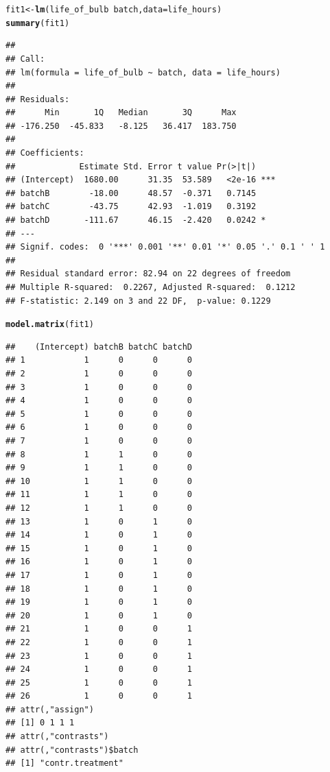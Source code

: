 \documentclass[11pt, a4paper]{article}\usepackage[]{graphicx}\usepackage[]{xcolor}
\makeatletter
\newcommand{\hlopt}[1]{\textcolor[rgb]{0,0,0}{#1}}%
\newcommand{\hlstd}[1]{\textcolor[rgb]{0.345,0.345,0.345}{#1}}%
\newcommand{\hlkwb}[1]{\textcolor[rgb]{0.69,0.353,0.396}{#1}}%
\newcommand{\hlkwc}[1]{\textcolor[rgb]{0.333,0.667,0.333}{#1}}%
\newcommand{\hlkwd}[1]{\textcolor[rgb]{0.737,0.353,0.396}{\textbf{#1}}}%
\newenvironment{kframe}{%
 \def\at@end@of@kframe{}%
 \ifinner\ifhmode%
  \def\at@end@of@kframe{\end{minipage}}%
  \begin{minipage}{\columnwidth}%
 \fi\fi%
 \def\FrameCommand##1{\hskip\@totalleftmargin \hskip-\fboxsep
 \colorbox{shadecolor}{##1}\hskip-\fboxsep
     \hskip-\linewidth \hskip-\@totalleftmargin \hskip\columnwidth}%
 \MakeFramed {\advance\hsize-\width
   \@totalleftmargin\z@ \linewidth\hsize
   \@setminipage}}%
 {\par\unskip\endMakeFramed%
 \at@end@of@kframe}
\newenvironment{knitrout}{}{} %
\makeatother
\begin{document}
\newpage

\begin{knitrout}
\color{fgcolor}\begin{kframe}
\begin{alltt}
\hlstd{fit1} \hlkwb{<-} \hlkwd{lm}\hlstd{(life_of_bulb} \hlopt{~} \hlstd{batch,} \hlkwc{data} \hlstd{= life_hours)}
\hlkwd{summary}\hlstd{(fit1)}
\end{alltt}
\begin{verbatim}
## 
## Call:
## lm(formula = life_of_bulb ~ batch, data = life_hours)
## 
## Residuals:
##      Min       1Q   Median       3Q      Max 
## -176.250  -45.833   -8.125   36.417  183.750 
## 
## Coefficients:
##             Estimate Std. Error t value Pr(>|t|)    
## (Intercept)  1680.00      31.35  53.589   <2e-16 ***
## batchB        -18.00      48.57  -0.371   0.7145    
## batchC        -43.75      42.93  -1.019   0.3192    
## batchD       -111.67      46.15  -2.420   0.0242 *  
## ---
## Signif. codes:  0 '***' 0.001 '**' 0.01 '*' 0.05 '.' 0.1 ' ' 1
## 
## Residual standard error: 82.94 on 22 degrees of freedom
## Multiple R-squared:  0.2267,	Adjusted R-squared:  0.1212 
## F-statistic: 2.149 on 3 and 22 DF,  p-value: 0.1229
\end{verbatim}
\end{kframe}
\end{knitrout}

\begin{knitrout}
\color{fgcolor}\begin{kframe}
\begin{alltt}
\hlkwd{model.matrix}\hlstd{(fit1)}
\end{alltt}
\begin{verbatim}
##    (Intercept) batchB batchC batchD
## 1            1      0      0      0
## 2            1      0      0      0
## 3            1      0      0      0
## 4            1      0      0      0
## 5            1      0      0      0
## 6            1      0      0      0
## 7            1      0      0      0
## 8            1      1      0      0
## 9            1      1      0      0
## 10           1      1      0      0
## 11           1      1      0      0
## 12           1      1      0      0
## 13           1      0      1      0
## 14           1      0      1      0
## 15           1      0      1      0
## 16           1      0      1      0
## 17           1      0      1      0
## 18           1      0      1      0
## 19           1      0      1      0
## 20           1      0      1      0
## 21           1      0      0      1
## 22           1      0      0      1
## 23           1      0      0      1
## 24           1      0      0      1
## 25           1      0      0      1
## 26           1      0      0      1
## attr(,"assign")
## [1] 0 1 1 1
## attr(,"contrasts")
## attr(,"contrasts")$batch
## [1] "contr.treatment"
\end{verbatim}
\end{kframe}
\end{knitrout}
\end{document}
